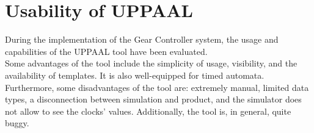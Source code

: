 \section{Usability of UPPAAL}

During the implementation of the Gear Controller system, the usage and capabilities of the UPPAAL tool have been evaluated. \\
Some advantages of the tool include the simplicity of usage, visibility, and the availability of templates. It is also well-equipped for timed automata. \\
Furthermore, some disadvantages of the tool are: extremely manual, limited data types, a disconnection between simulation and product, and the simulator does not allow to see the clocks' values. Additionally, the tool is, in general, quite buggy.